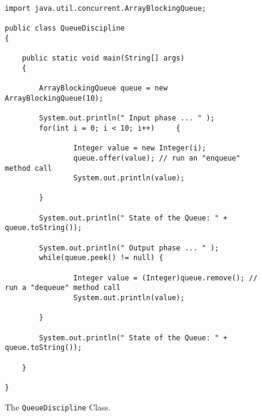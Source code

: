 \documentclass[12pt]{article}
\begin{document}
\begin{enumerate}
\newpage

\begin{figure}[t]

\footnotesize{
\begin{verbatim}
import java.util.concurrent.ArrayBlockingQueue;

public class QueueDiscipline
{

    public static void main(String[] args)
    {

        ArrayBlockingQueue queue = new ArrayBlockingQueue(10);

        System.out.println(" Input phase ... " );
        for(int i = 0; i < 10; i++)	    {

                Integer value = new Integer(i);
                queue.offer(value); // run an "enqueue" method call
                System.out.println(value);

        }

        System.out.println(" State of the Queue: " + queue.toString());

        System.out.println(" Output phase ... " );
        while(queue.peek() != null) {

                Integer value = (Integer)queue.remove(); // run a "dequeue" method call
                System.out.println(value);

        }

        System.out.println(" State of the Queue: " + queue.toString());

    }

}
\end{verbatim}
}

\caption{The {\tt QueueDiscipline} Class.}
\label{Queue}
\end{figure}






\end{enumerate}
\end{document}
